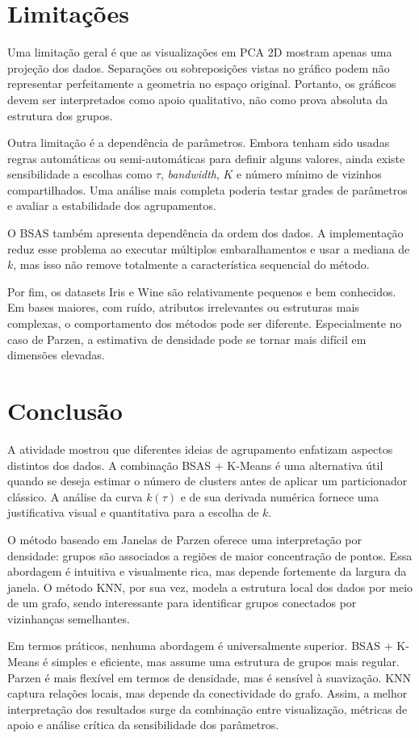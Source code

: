 \documentclass[12pt,a4paper]{article}
\begin{document}
\FloatBarrier

\section{Limitações}

Uma limitação geral é que as visualizações em PCA 2D mostram apenas uma
projeção dos dados. Separações ou sobreposições vistas no gráfico podem não
representar perfeitamente a geometria no espaço original. Portanto, os gráficos
devem ser interpretados como apoio qualitativo, não como prova absoluta da
estrutura dos grupos.

Outra limitação é a dependência de parâmetros. Embora tenham sido usadas regras
automáticas ou semi-automáticas para definir alguns valores, ainda existe
sensibilidade a escolhas como $\tau$, \textit{bandwidth}, $K$ e número mínimo de
vizinhos compartilhados. Uma análise mais completa poderia testar grades de
parâmetros e avaliar a estabilidade dos agrupamentos.

O BSAS também apresenta dependência da ordem dos dados. A implementação reduz
esse problema ao executar múltiplos embaralhamentos e usar a mediana de $k$, mas
isso não remove totalmente a característica sequencial do método.

Por fim, os datasets Iris e Wine são relativamente pequenos e bem conhecidos.
Em bases maiores, com ruído, atributos irrelevantes ou estruturas mais
complexas, o comportamento dos métodos pode ser diferente. Especialmente no
caso de Parzen, a estimativa de densidade pode se tornar mais difícil em
dimensões elevadas.

\section{Conclusão}

A atividade mostrou que diferentes ideias de agrupamento enfatizam aspectos
distintos dos dados. A combinação BSAS + K-Means é uma alternativa útil quando
se deseja estimar o número de clusters antes de aplicar um particionador
clássico. A análise da curva $k(\tau)$ e de sua derivada numérica fornece uma
justificativa visual e quantitativa para a escolha de $k$.

O método baseado em Janelas de Parzen oferece uma interpretação por densidade:
grupos são associados a regiões de maior concentração de pontos. Essa abordagem
é intuitiva e visualmente rica, mas depende fortemente da largura da janela. O
método KNN, por sua vez, modela a estrutura local dos dados por meio de um
grafo, sendo interessante para identificar grupos conectados por vizinhanças
semelhantes.

Em termos práticos, nenhuma abordagem é universalmente superior. BSAS + K-Means
é simples e eficiente, mas assume uma estrutura de grupos mais regular. Parzen é
mais flexível em termos de densidade, mas é sensível à suavização. KNN
captura relações locais, mas depende da conectividade do grafo. Assim, a melhor
interpretação dos resultados surge da combinação entre visualização, métricas de
apoio e análise crítica da sensibilidade dos parâmetros.
\end{document}
